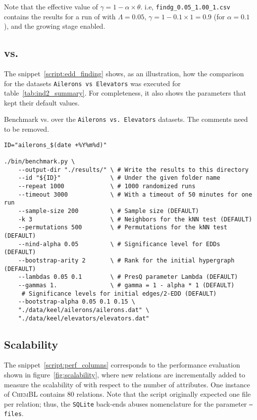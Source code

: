 Note that the effective value of $\gamma = 1 -\alpha \times \theta$. i.e, \texttt{findg\_0.05\_1.00\_1.csv} contains
the results for a run of \PresQ with $\Lambda = 0.05$, $\gamma = 1 - 0.1 \times 1 = 0.9$ (for $\alpha = 0.1$),
and the growing stage enabled.

\subsection{\Find vs. \PresQ}

The snippet~\ref{script:edd_finding} shows, as an illustration, how the comparison for the
datasets \texttt{Ailerons vs Elevators} was executed for table~\ref{tab:ind2_summary}.
For completeness, it also shows the parameters that kept their default values.

\begin{code}
\caption[Benchmark \Find vs. \PresQ over the \texttt{Ailerons vs Elevators} datasets.]{
Benchmark \Find vs. \PresQ over the \texttt{Ailerons vs. Elevators} datasets. The comments need to be removed.}\label{script:edd_finding}
\begin{verbatim}
ID="ailerons_$(date +%Y%m%d)"

./bin/benchmark.py \
    --output-dir "./results/" \ # Write the results to this directory
    --id "${ID}"              \ # Under the given folder name
    --repeat 1000             \ # 1000 randomized runs
    --timeout 3000            \ # With a timeout of 50 minutes for one run
    --sample-size 200         \ # Sample size (DEFAULT)
    -k 3                      \ # Neighbors for the kNN test (DEFAULT)
    --permutations 500        \ # Permutations for the kNN test (DEFAULT)
    --nind-alpha 0.05         \ # Significance level for EDDs (DEFAULT)
    --bootstrap-arity 2       \ # Rank for the initial hypergraph (DEFAULT)
    --lambdas 0.05 0.1        \ # PresQ parameter Lambda (DEFAULT)
    --gammas 1.               \ # gamma = 1 - alpha * 1 (DEFAULT)
     # Significance levels for initial edges/2-EDD (DEFAULT)
    --bootstrap-alpha 0.05 0.1 0.15 \
    "./data/keel/ailerons/ailerons.dat" \
    "./data/keel/elevators/elevators.dat"
\end{verbatim}
\end{code}

\subsection{Scalability}

The snippet~\ref{script:perf_columns} corresponds to the performance evaluation shown
in figure~\ref{fig:scalability}, where new relations are incrementally added to measure
the scalability of \PresQ with respect to the number of attributes.
One instance of \textsc{ChemBL} contains 80 relations. Note that the script
originally expected one file per relation; thus, the \texttt{SQLite} back-ends abuses
nomenclature for the parameter \texttt{--files}.

